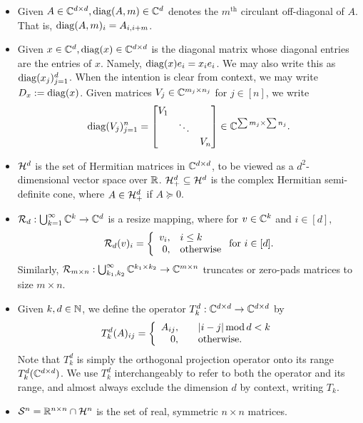 \begin{itemize}
\item Given $A \in \mathbb{C}^{d \times d}, \operatorname{diag}(A, m) \in \mathbb{C}^d$ denotes the $m^{\text{th}}$ circulant off-diagonal of $A$.  That is, $\operatorname{diag}(A, m)_i = A_{i, i + m}$.
\item Given $x \in \mathbb{C}^d, \operatorname{diag}(x) \in \mathbb{C}^{d \times d}$ is the diagonal matrix whose diagonal entries are the entries of $x$.  Namely, $\operatorname{diag}(x) e_i = x_i e_i$.  We may also write this as $\operatorname{diag}(x_j)_{j = 1}^d$.  When the intention is clear from context, we may write $D_x := \operatorname{diag}(x)$.  Given matrices $V_j \in \mathbb{C}^{m_j \times n_j}$ for $j \in [n]$, we write \[\operatorname{diag}(V_j)_{j = 1}^n = \begin{bmatrix} V_1 & & \\ & \ddots & \\ & & V_n \end{bmatrix} \in \mathbb{C}^{\sum m_j \times \sum n_j}.\]
  \item $\mathcal{H}^d$ is the set of Hermitian matrices in $\mathbb{C}^{d \times d}$, to be viewed as a $d^2$-dimensional vector space over $\mathbb{R}$.  $\mathcal{H}^d_+ \subseteq \mathcal{H}^d$ is the complex Hermitian semi-definite cone, where $A \in \mathcal{H}^d_+$ if $A \succeq 0$.
  \item $\mathcal{R}_d : \bigcup_{k = 1}^\infty \mathbb{C}^k \to \mathbb{C}^d$ is a resize mapping, where for $v \in \mathbb{C}^k$ and $i \in [d],$ $$\mathcal{R}_d(v)_i = \left\{\begin{array}{r@{,\quad}l} v_i & i \le k \\ 0 & \text{otherwise} \end{array}\right. \text{for}\ i \in [d].$$  Similarly, $\mathcal{R}_{m \times n} : \bigcup_{k_1, k_2}^\infty \mathbb{C}^{k_1 \times k_2} \to \mathbb{C}^{m \times n}$ truncates or zero-pads matrices to size $m \times n.$
  \item Given $k, d \in \mathbb{N}$, we define the operator $T^d_k : \mathbb{C}^{d \times d} \to \mathbb{C}^{d \times d}$ by \[T_k^d(A)_{ij} = \left\{\begin{array}{r@{,\qquad}l} A_{ij} & |i - j| \mod d < k \\ 0 & \text{otherwise}. \end{array}\right.\]  Note that $T^d_k$ is simply the orthogonal projection operator onto its range $T_k^d(\mathbb{C}^{d \times d})$.  We use $T^d_k$ interchangeably to refer to both the operator and its range, and almost always exclude the dimension $d$ by context, writing $T_k$.
  \item $\mathcal{S}^n = \mathbb{R}^{n \times n} \cap \mathcal{H}^n$ is the set of real, symmetric $n \times n$ matrices.
    
    
\end{itemize}
